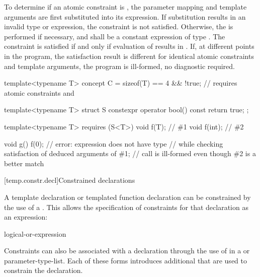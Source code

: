 \pnum
To determine if an atomic constraint is
,
the parameter mapping and template arguments are
first substituted into its expression.
If substitution results in an invalid type or expression,
the constraint is not satisfied.
Otherwise, the 
is performed if necessary,
and  shall be a constant expression of type .
The constraint is satisfied if and only if evaluation of 
results in .
If, at different points in the program, the satisfaction result is different
for identical atomic constraints and template arguments,
the program is ill-formed, no diagnostic required.
\begin{example}
\begin{codeblock}
template<typename T> concept C =
  sizeof(T) == 4 && !true;      // requires atomic constraints  and 

template<typename T> struct S {
  constexpr operator bool() const { return true; }
};

template<typename T> requires (S<T>{})
void f(T);                      // \#1
void f(int);                    // \#2

void g() {
  f(0);                         // error: expression  does not have type 
}                               // while checking satisfaction of deduced arguments of \#1;
                                // call is ill-formed even though \#2 is a better match
\end{codeblock}
\end{example}

[temp.constr.decl]{Constrained declarations}

\pnum
A template declaration
or templated function declaration
can be constrained by the use of a .
This allows the specification of constraints for that declaration as
an expression:

\begin{bnf}
\br
    logical-or-expression
\end{bnf}

\pnum
Constraints can also be associated with a declaration through the use of
in a  or parameter-type-list.
Each of these forms introduces additional 
that are used to constrain the declaration.

